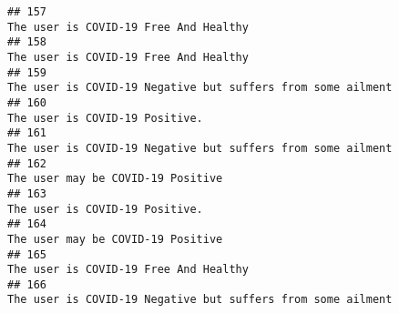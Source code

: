 \documentclass[
]{article}
\begin{document}
\begin{verbatim}
## 157                                                                                                                                                                                                                              The user is COVID-19 Free And Healthy
## 158                                                                                                                                                                                                                              The user is COVID-19 Free And Healthy
## 159                                                                                                                                                                                                        The user is COVID-19 Negative but suffers from some ailment
## 160                                                                                                                                                                                                                                     The user is COVID-19 Positive.
## 161                                                                                                                                                                                                        The user is COVID-19 Negative but suffers from some ailment
## 162                                                                                                                                                                                                                                  The user may be COVID-19 Positive
## 163                                                                                                                                                                                                                                     The user is COVID-19 Positive.
## 164                                                                                                                                                                                                                                  The user may be COVID-19 Positive
## 165                                                                                                                                                                                                                              The user is COVID-19 Free And Healthy
## 166                                                                                                                                                                                                        The user is COVID-19 Negative but suffers from some ailment

\end{verbatim}
\end{document}
